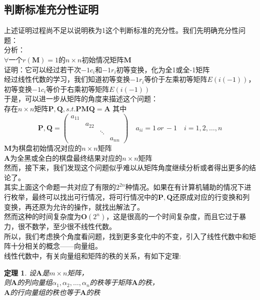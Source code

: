 \documentclass[UTF-8,a4paper]{ctexart}
\newtheorem{theorem}[subsubsection]{定理}
\begin{document}
\subsection{判断标准充分性证明}
\songti
上述证明过程尚不足以说明秩为1这个判断标准的充分性。我们先明确充分性问题：
\kaishu
\\分析：
\\ \(\forall\)一个\(r(\mathbf{M})=1\)的\(n \times n\)初始情况矩阵\(\mathbf{M}\)
\\证明：它可以经过若干次\(-1c_i\)和\(-1r_i\)初等变换，化为全1或全-1矩阵
\\ \songti 经过线性代数的学习，我们知道初等变换\(-1r_i\)等价于左乘初等矩阵\(E(i(-1))\)，初等变换\(-1c_i\)等价于右乘初等矩阵\(E(i(-1))\)
\\于是，可以进一步从矩阵的角度来描述这个问题：
\kaishu
\\存在\(n \times n\)矩阵\(\mathbf{P}, \mathbf{Q},s.t. \mathbf{P}\mathbf{M}\mathbf{Q}=\mathbf{A}\)
其中\[\mathbf{P},\mathbf{Q}=\begin{pmatrix}
    a_{11}
    \\&a_{22}
    \\&& \ddots
    \\ &&& a_{nn}
\end{pmatrix} \quad
a_{ii}= 1\,or\,-1 \quad
i = 1,2,\dots,n
\]
\(\mathbf{M}\)为棋盘初始情况对应的\(n \times n\)矩阵
\\\(\mathbf{A}\)为全黑或全白的棋盘最终结果对应的\(n \times n\)矩阵
\songti
\\然而，接下来，我们发现这个问题似乎难以从矩阵角度继续分析或者得出更多的结论了。
\\其实上面这个命题一共对应了有限的\(2^{2n}\)种情况。如果在有计算机辅助的情况下进行枚举，最终可以找出可行情况，将可行情况中的\(\mathbf{P},\mathbf{Q}\)还原成对应的行变换和列变换，再还原为允许的操作，就找出解法了。
\\然而这种的时间复杂度为\(\mathbf{O}(2^n)\)，这是很高的一个时间复杂度，而且它过于暴力，很不数学，至少很不线性代数。
\\所以，我们考虑换个角度看问题，找到更多变化中的不变，引入了线性代数中和矩阵十分相关的概念——向量组。
\kaishu
\\线性代数中，有关向量组和矩阵的秩的关系，有如下定理:
\begin{theorem}
    \label{vectorR}
    设\(\mathbf{A}\)是\(m \times n\)矩阵，\\则\(\mathbf{A}\)的列向量组\(\alpha_1,\alpha_2,\dots,\alpha_n\)的秩等于矩阵\(\mathbf{A}\)的秩，
    \\ \(\mathbf{A}\)的行向量组的秩也等于\(\mathbf{A}\)的秩
\end{theorem}
\end{document}

